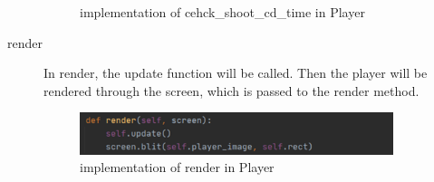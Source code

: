 \documentclass[14pt]{extarticle}
\begin{document}
\begin{description}
\begin{figure}[H]
\begin{center}
			\caption{implementation of cehck\_shoot\_cd\_time in Player}
		\end{center}
	\end{figure}
	\item[render]
	In render, the update function will be called. Then the player will be rendered through the screen, which is passed to the render method.
	\begin{figure}[H]
		\begin{center}
			\includegraphics[width=0.9\textwidth]{Player_render}
			\caption{implementation of render in Player}
		\end{center}
	\end{figure}
\end{description}
\end{document}
